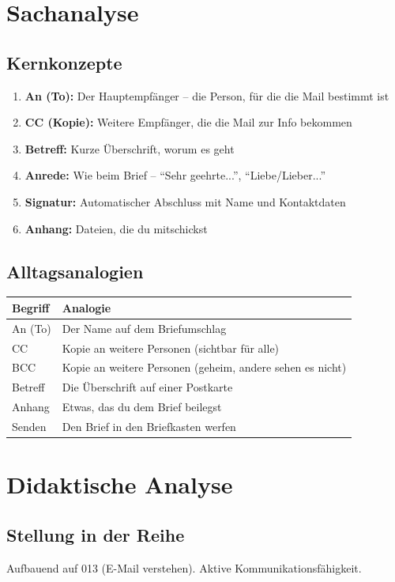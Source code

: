 \documentclass[11pt,a4paper]{article}
\begin{document}
\section{Sachanalyse}

\subsection{Kernkonzepte}
\begin{enumerate}
    \item \textbf{An (To):} Der Hauptempfänger -- die Person, für die die Mail bestimmt ist
    \item \textbf{CC (Kopie):} Weitere Empfänger, die die Mail zur Info bekommen
    \item \textbf{Betreff:} Kurze Überschrift, worum es geht
    \item \textbf{Anrede:} Wie beim Brief -- ``Sehr geehrte...'', ``Liebe/Lieber...''
    \item \textbf{Signatur:} Automatischer Abschluss mit Name und Kontaktdaten
    \item \textbf{Anhang:} Dateien, die du mitschickst
\end{enumerate}

\subsection{Alltagsanalogien}
\begin{tabular}{|l|p{8cm}|}
\hline
\textbf{Begriff} & \textbf{Analogie} \\
\hline
An (To) & Der Name auf dem Briefumschlag \\
CC & Kopie an weitere Personen (sichtbar für alle) \\
BCC & Kopie an weitere Personen (geheim, andere sehen es nicht) \\
Betreff & Die Überschrift auf einer Postkarte \\
Anhang & Etwas, das du dem Brief beilegst \\
Senden & Den Brief in den Briefkasten werfen \\
\hline
\end{tabular}

\section{Didaktische Analyse}

\subsection{Stellung in der Reihe}
Aufbauend auf 013 (E-Mail verstehen). Aktive Kommunikationsfähigkeit.
\end{document}
